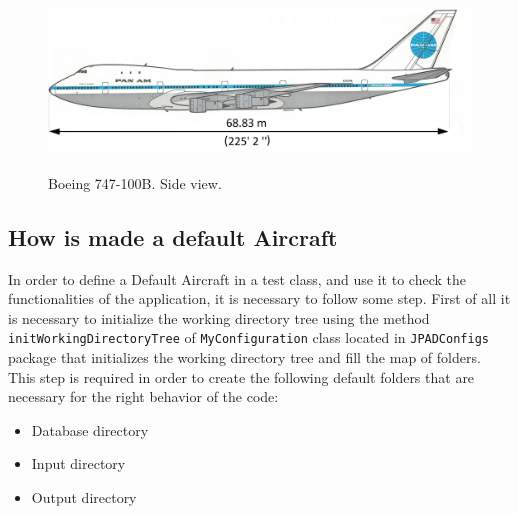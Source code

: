 \begin{figure}[H]
\centering
{\includegraphics[height=4cm]{Immagini/boeing.jpg}} 
\caption{Boeing 747-100B. Side view.}
\end{figure}

\subsection {How is made a default Aircraft}
In order to define a Default Aircraft in a test class, and use it to check the functionalities of the application, it is necessary to follow some step. First of all it is necessary to initialize the working directory tree using the method \texttt{initWorkingDirectoryTree} of \texttt{MyConfiguration} class located in \texttt{JPADConfigs} package that initializes the working directory tree and fill the map of folders. 
This step is required in order to create the following default folders that are necessary for the right behavior of the code:

\begin{itemize}
\item Database directory
\item Input directory
\item Output directory
\end{itemize}

